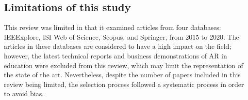 \subsection{Limitations of this study}
This review was limited in that it examined articles from four databases: IEEExplore, ISI Web of Science, Scopus, and Springer, from 2015 to 2020. The articles in these databases are considered to have a high impact on the field; however, the latest technical reports and business demonstrations of AR in education were excluded from this review, which may limit the representation of the state of the art. Nevertheless, despite the number of papers included in this review being limited, the selection process followed a systematic process in order to avoid bias.